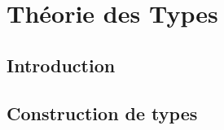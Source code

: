 \documentclass[a4paper, 11pt]{article}
\title{\Title}
\author{\Author}
\date{\today}
\begin{document}
  \maketitle
  \tableofcontents
  \pagebreak

  \section{Théorie des Types}
    \subsection{Introduction}
      


    \subsection{Construction de types}
      

\end{document}
